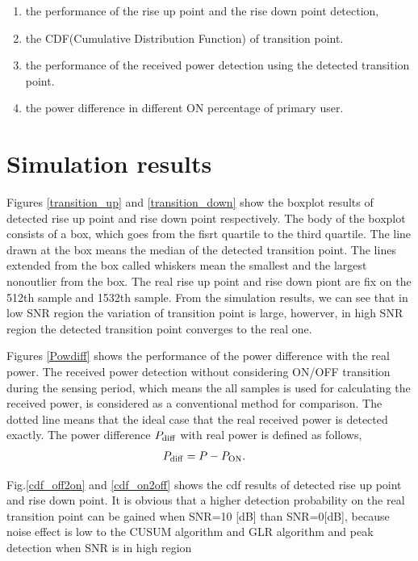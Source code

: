 \begin{enumerate}
\item the performance of the rise up point and the rise down point detection, 
\item the CDF(Cumulative Distribution Function) of transition point.
\item the performance of the received power detection using the detected transition point.
\item the power difference in different ON percentage of primary user.
\end{enumerate}

\section{Simulation results}
Figures \ref{transition_up} and \ref{transition_down} show the boxplot results of detected rise up point and rise down point respectively. The body of the boxplot consists of a box, which goes from the fisrt quartile to the third quartile. The line drawn at the box means the median of the detected transition point. The lines extended from the box called whiskers mean the smallest and the largest nonoutlier from the box. The real rise up point and rise down piont are fix on the 512th sample and 1532th sample. From the simulation results, we can see that in low SNR region the variation of transition point is large, howerver, in high SNR region the detected transition point converges to the real one.

Figures \ref{Powdiff} shows the performance of the power difference with the real power. 
The received power detection without considering ON/OFF transition during the sensing period, which means the all samples is used for calculating the received power, is considered as a conventional method for comparison. The dotted line means that the ideal case that the real received power is detected exactly. The power difference $P_{\rm diff}$ with real power is defined as follows,
\begin{eqnarray}
P_{{\rm diff}} &= P-P_{{\rm ON}}.
\label{diff}
\end{eqnarray}

Fig.\ref{cdf_off2on} and \ref{cdf_on2off} shows the cdf results of detected rise up point and rise down point. It is obvious that a higher detection probability on the real transition point can be gained  when SNR=10 [dB] than SNR=0[dB], because noise effect is low to the CUSUM algorithm and GLR algorithm and peak detection when SNR is in high region

